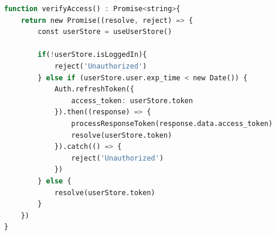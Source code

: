 \begin{lstlisting}[language=Octave, caption=TS example]
function verifyAccess() : Promise<string>{
    return new Promise((resolve, reject) => {
        const userStore = useUserStore()
        
        if(!userStore.isLoggedIn){
            reject('Unauthorized')
        } else if (userStore.user.exp_time < new Date()) {
            Auth.refreshToken({
                access_token: userStore.token
            }).then((response) => {
                processResponseToken(response.data.access_token)
                resolve(userStore.token)
            }).catch(() => {
                reject('Unauthorized')
            })
        } else {
            resolve(userStore.token)
        }
    })
}
\end{lstlisting}
